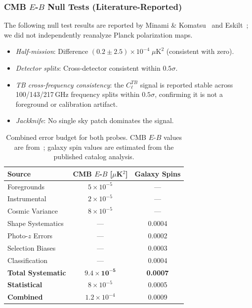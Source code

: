 \documentclass[aps,prd,twocolumn,superscriptaddress,showpacs,preprintnumbers,nofootinbib,longbibliography,floatfix]{revtex4-2}
\begin{document}
\subsubsection{CMB $E$-$B$ Null Tests (Literature-Reported)}

The following null test results are reported by Minami \& Komatsu~\cite{Minami2020} and Eskilt~\cite{Eskilt2022}; we did not independently reanalyze Planck polarization maps.
\begin{itemize}[leftmargin=*]
\item \textit{Half-mission}: Difference $(0.2 \pm 2.5)\times 10^{-4}\;\mu\text{K}^2$ (consistent with zero).
\item \textit{Detector splits}: Cross-detector consistent within $0.5\sigma$.
\item \textit{TB cross-frequency consistency}: the $C_\ell^{TB}$ signal is reported stable across 100/143/217\,GHz frequency splits within $0.5\sigma$, confirming it is not a foreground or calibration artifact.
\item \textit{Jackknife}: No single sky patch dominates the signal.
\end{itemize}

\begin{table}[t]
\caption{\label{tab:errorbudget} Combined error budget for both probes. CMB $E$-$B$ values are from~\cite{Minami2020,Eskilt2022}; galaxy spin values are estimated from the published catalog analysis.}
\begin{ruledtabular}
\begin{tabular}{lcc}
Source & CMB $E$-$B$ [$\mu$K$^2$] & Galaxy Spins \\
\hline
Foregrounds & $5\times 10^{-5}$ & --- \\
Instrumental & $2\times 10^{-5}$ & --- \\
Cosmic Variance & $8\times 10^{-5}$ & --- \\
Shape Systematics & --- & 0.0004 \\
Photo-$z$ Errors & --- & 0.0002 \\
Selection Biases & --- & 0.0003 \\
Classification & --- & 0.0004 \\
\hline
\textbf{Total Systematic} & $\mathbf{9.4\times 10^{-5}}$ & \textbf{0.0007} \\
\textbf{Statistical} & $8\times 10^{-5}$ & 0.0005 \\
\textbf{Combined} & $1.2\times 10^{-4}$ & 0.0009 \\
\end{tabular}
\end{ruledtabular}
\end{table}
\end{document}
